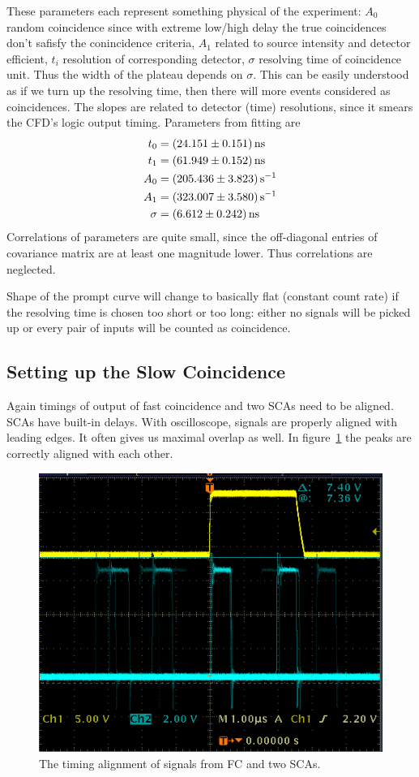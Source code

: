 These parameters each represent something physical of the experiment: $A_0$ random coincidence since with extreme low/high delay the true coincidences don't safisfy the conincidence criteria, $A_1$ related to source intensity and detector efficient, $t_i$ resolution of corresponding detector, $\sigma$ resolving time of coincidence unit. Thus the width of the plateau depends on $\sigma$. This can be easily understood as if we turn up the resolving time, then there will more events considered as coincidences. The slopes are related to detector (time) resolutions, since it smears the CFD's logic output timing. Parameters from fitting are
\begin{align*}
   t_0 &= \SI{24.151 +- 0.151}{\nano\s} \\
   t_1 &=  \SI{61.949 +- 0.152}{\nano\s} \\
   A_0 &= \SI{205.436 +- 3.823}{\per\s} \\
   A_1 &= \SI{323.007 +- 3.580}{\per\s} \\
   \sigma &= \SI{6.612 +- 0.242}{\nano\s}
\end{align*}
Correlations of parameters are quite small, since the off-diagonal entries of covariance matrix are at least one magnitude lower. Thus correlations are neglected.

Shape of the prompt curve will change to basically flat (constant count rate) if the resolving time is chosen too short or too long: either no signals will be picked up or every pair of inputs will be counted as coincidence.

\subsection{Setting up the Slow Coincidence}
Again timings of output of fast coincidence and two SCAs need to be aligned. SCAs have built-in delays. With oscilloscope, signals are properly aligned with leading edges. It often gives us maximal overlap as well. In figure~\ref{fig:slow} the peaks are correctly aligned with each other.
\begin{figure}[ht]
	\centering
	\includegraphics[width=0.5\linewidth]{./figs/slow.png}
	\caption{The timing alignment of signals from FC and two SCAs.}%
	\label{fig:slow}
\end{figure}


